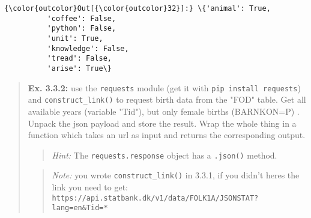 \documentclass[11pt]{article}
\begin{document}
\begin{Verbatim}[commandchars=\\\{\}]
{\color{outcolor}Out[{\color{outcolor}32}]:} \{'animal': True,
          'coffee': False,
          'python': False,
          'unit': True,
          'knowledge': False,
          'tread': False,
          'arise': True\}
\end{Verbatim}
            
    \begin{quote}
\textbf{Ex. 3.3.2:} use the \texttt{requests} module (get it with
\texttt{pip\ install\ requests}) and \texttt{construct\_link()} to
request birth data from the "FOD" table. Get all available years
(variable "Tid"), but only female births (BARNKON=P) . Unpack the json
payload and store the result. Wrap the whole thing in a function which
takes an url as input and returns the corresponding output.

\begin{quote}
\emph{Hint:} The \texttt{requests.response} object has a
\texttt{.json()} method.
\end{quote}

\begin{quote}
\emph{Note:} you wrote \texttt{construct\_link()} in 3.3.1, if you
didn't heres the link you need to get:
\texttt{https://api.statbank.dk/v1/data/FOLK1A/JSONSTAT?lang=en\&Tid=*}
\end{quote}
\end{quote}
\end{document}
